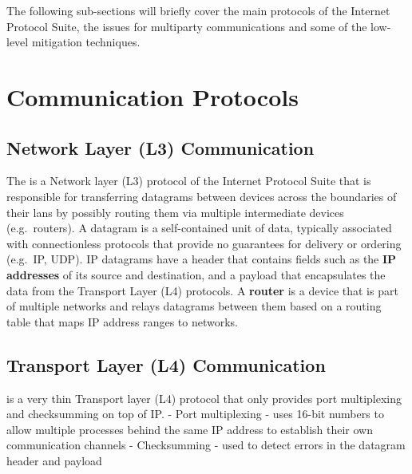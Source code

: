 The following sub-sections will briefly cover the main protocols of the
Internet Protocol Suite, the issues for multiparty communications and
some of the low-level mitigation techniques.


\hypertarget{communication-protocols}{%
\section{Communication Protocols}\label{communication-protocols}}

\hypertarget{network-layer-l3-communication}{%
\subsection{Network Layer (L3)
Communication}\label{network-layer-l3-communication}}

The  \autocite{ipv4RFC} is a Network layer (L3) protocol of the
Internet Protocol Suite that is responsible for transferring datagrams
between devices across the boundaries of their \glspl{lan} by possibly
routing them via multiple intermediate devices (e.g.~routers). A
datagram is a self-contained unit of data, typically associated with
connectionless protocols that provide no guarantees for delivery or
ordering (e.g.~IP, UDP).
 IP datagrams
have a header that contains fields such as the \textbf{IP addresses} of
its source and destination, and a
payload that encapsulates the data from the Transport Layer (L4)
protocols. A \textbf{router} is a device that is part of multiple
networks and relays datagrams between them based on a routing table that
maps IP address ranges to networks.

\hypertarget{transport-layer-l4-communication}{%
\subsection{Transport Layer (L4)
Communication}\label{transport-layer-l4-communication}}

 is a very thin Transport layer (L4) protocol that only provides
port multiplexing and checksumming on top of IP. - Port multiplexing -
uses 16-bit numbers to allow multiple processes behind the same IP
address to establish their own communication channels - Checksumming -
used to detect errors in the datagram header and payload

